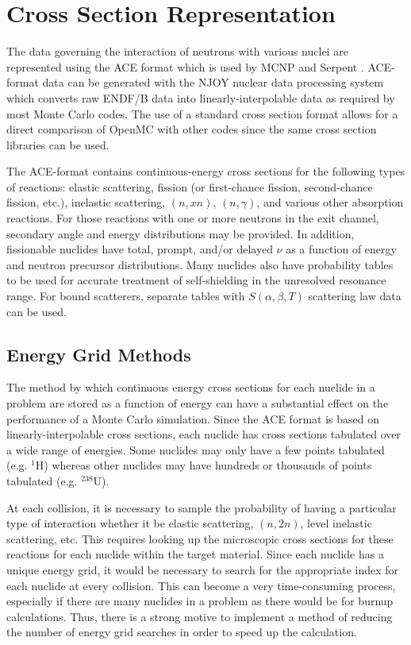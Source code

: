 \section{Cross Section Representation}

The data governing the interaction of neutrons with various nuclei are
represented using the ACE format \cite{lanl-x5-2008-ace} which is used by MCNP
\cite{lanl-x5-2008} and Serpent \cite{vtt-leppanen-2007}. ACE-format data can be
generated with the NJOY nuclear data processing system
\cite{nds-macfarlane-2010} which converts raw ENDF/B data
\cite{nds-chadwick-2011} into linearly-interpolable data as required by most
Monte Carlo codes. The use of a standard cross section format allows for a
direct comparison of OpenMC with other codes since the same cross section
libraries can be used.

The ACE-format contains continuous-energy cross sections for the following types
of reactions: elastic scattering, fission (or first-chance fission,
second-chance fission, etc.), inelastic scattering, $(n,xn)$, $(n,\gamma)$, and
various other absorption reactions. For those reactions with one or more
neutrons in the exit channel, secondary angle and energy distributions may be
provided. In addition, fissionable nuclides have total, prompt, and/or delayed
$\nu$ as a function of energy and neutron precursor distributions. Many nuclides
also have probability tables to be used for accurate treatment of self-shielding
in the unresolved resonance range. For bound scatterers, separate tables with
$S(\alpha,\beta,T)$ scattering law data can be used.

\subsection{Energy Grid Methods}

The method by which continuous energy cross sections for each nuclide in a
problem are stored as a function of energy can have a substantial effect on the
performance of a Monte Carlo simulation. Since the ACE format is based on
linearly-interpolable cross sections, each nuclide has cross sections tabulated
over a wide range of energies. Some nuclides may only have a few points
tabulated (e.g. $^1$H) whereas other nuclides may have hundreds or thousands of
points tabulated (e.g. $^{238}$U).

At each collision, it is necessary to sample the probability of having a
particular type of interaction whether it be elastic scattering, $(n,2n)$, level
inelastic scattering, etc. This requires looking up the microscopic cross
sections for these reactions for each nuclide within the target material. Since
each nuclide has a unique energy grid, it would be necessary to search for the
appropriate index for each nuclide at every collision. This can become a very
time-consuming process, especially if there are many nuclides in a problem as
there would be for burnup calculations. Thus, there is a strong motive to
implement a method of reducing the number of energy grid searches in order to
speed up the calculation.


